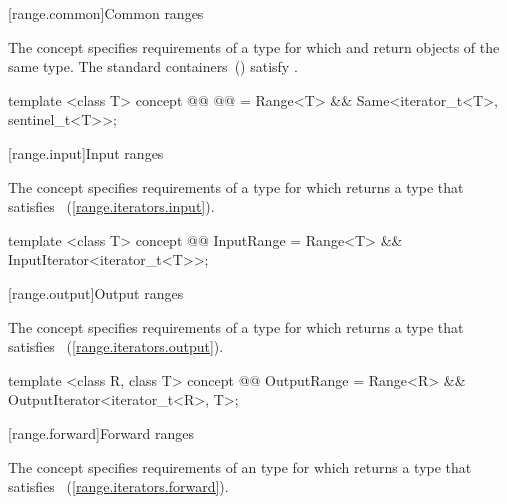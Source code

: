 {[range.common]{Common ranges}


\pnum
The  concept specifies requirements
of a  type for which  and  return objects of
the same type. \enternote The standard containers~()
satisfy .\exitnote

\begin{codeblock}
template <class T>
concept @@ @@ =
  Range<T> && Same<iterator_t<T>, sentinel_t<T>>;
\end{codeblock}

[range.input]{Input ranges}

\pnum
The  concept specifies requirements of
a  type for which  returns a type
that satisfies ~(\ref{range.iterators.input}).

\begin{codeblock}
template <class T>
concept @@ InputRange =
  Range<T> && InputIterator<iterator_t<T>>;
\end{codeblock}

[range.output]{Output ranges}

\pnum
The  concept specifies requirements of
a  type for which  returns a type that satisfies
~(\ref{range.iterators.output}).

\begin{codeblock}
template <class R, class T>
concept @@ OutputRange =
  Range<R> && OutputIterator<iterator_t<R>, T>;
\end{codeblock}

[range.forward]{Forward ranges}

\pnum
The  concept specifies requirements of an
 type for which  returns a type that satisfies
~(\ref{range.iterators.forward}).

}
